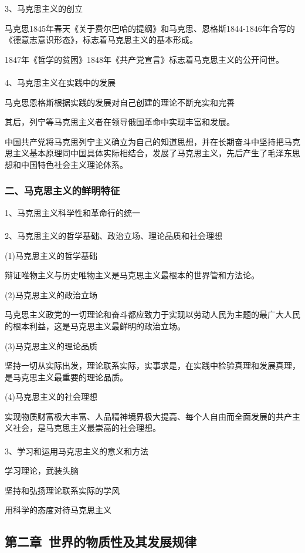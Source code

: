 \documentclass{ctexart}
\begin{document}
3、马克思主义的创立

马克思1845年春天《关于费尔巴哈的提纲》和马克思、恩格斯1844-1846年合写的《德意志意识形态》，标志着马克思主义的基本形成。

1847年《哲学的贫困》1848年《共产党宣言》标志着马克思主义的公开问世。
\\\\

4、马克思主义在实践中的发展

马克思恩格斯根据实践的发展对自己创建的理论不断充实和完善

其后，列宁等马克思主义者在领导俄国革命中实现丰富和发展。

中国共产党将马克思列宁主义确立为自己的知道思想，并在长期奋斗中坚持把马克思主义基本原理同中国具体实际相结合，发展了马克思主义，先后产生了毛泽东思想和中国特色社会主义理论体系。

\subsubsection{二、马克思主义的鲜明特征}
1、马克思主义科学性和革命行的统一
\\\\

2、马克思主义的哲学基础、政治立场、理论品质和社会理想

(1)马克思主义的哲学基础

辩证唯物主义与历史唯物主义是马克思主义最根本的世界管和方法论。

(2)马克思主义的政治立场

马克思主义政党的一切理论和奋斗都应致力于实现以劳动人民为主题的最广大人民的根本利益，这是马克思主义最鲜明的政治立场。

(3)马克思主义的理论品质

坚持一切从实际出发，理论联系实际，实事求是，在实践中检验真理和发展真理，是马克思主义最重要的理论品质。

(4)马克思主义的社会理想

实现物质财富极大丰富、人品精神境界极大提高、每个人自由而全面发展的共产主义社会，是马克思主义最崇高的社会理想。
\\\\

3、学习和运用马克思主义的意义和方法

学习理论，武装头脑

坚持和弘扬理论联系实际的学风

用科学的态度对待马克思主义



\subsection{第二章\ 世界的物质性及其发展规律}
\end{document}
